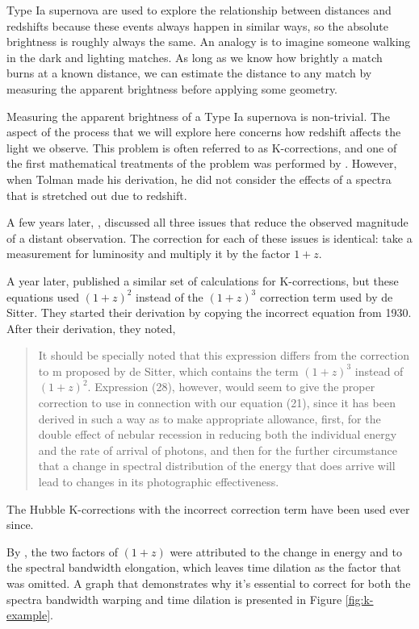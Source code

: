 \documentclass{article}
\begin{document}
Type Ia supernova are used to explore the relationship between distances and
redshifts because these events always happen in similar ways, so the absolute
brightness is roughly always the same. An analogy is to imagine someone walking
in the dark and lighting matches. As long as we know how brightly a match burns
at a known distance, we can estimate the distance to any match by measuring the
apparent brightness before applying some geometry.

Measuring the apparent brightness of a Type Ia supernova is non-trivial. The
aspect of the process that we will explore here concerns how redshift affects
the light we observe. This problem is often referred to as K-corrections, and
one of the first mathematical treatments of the problem was performed by
\citet{tolman1930}. However, when Tolman made his derivation, he did not
consider the effects of a spectra that is stretched out due to redshift.

A few years later, \citet{desitter1934}, discussed all three issues that reduce
the observed magnitude of a distant observation. The correction for each of
these issues is identical: take a measurement for luminosity and multiply it by
the factor $1 + z$.

A year later, \citet{hubble1935} published a similar set of calculations for
K-corrections, but these equations used $(1 + z)^2$ instead of the $(1 + z)^3$
correction term used by de Sitter. They started their derivation by copying the
incorrect equation from 1930. After their derivation, they noted,

\begin{quote}
It should be specially noted that this expression differs from the correction
to m proposed by de Sitter, which contains the term $(1 + z)^3$ instead of
$(1 + z)^2$. Expression (28), however, would seem to give the proper correction
to use in connection with our equation (21), since it has been derived in such
a way as to make appropriate allowance, first, for the double effect of nebular
recession in reducing both the individual energy and the rate of arrival of
photons, and then for the further circumstance that a change in spectral
distribution of the energy that does arrive will lead to changes in its
photographic effectiveness.
\end{quote}

The Hubble K-corrections with the incorrect correction term have been used ever
since.

By \citet{oke1968}, the two factors of $(1 + z)$ were attributed to the change
in energy and to the spectral bandwidth elongation, which leaves time dilation
as the factor that was omitted. A graph that demonstrates why it's essential to
correct for both the spectra bandwidth warping and time dilation is presented
in Figure \ref{fig:k-example}.
\end{document}
